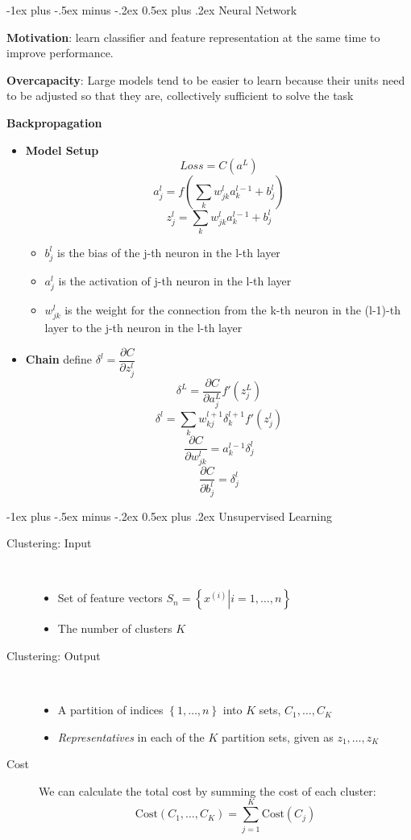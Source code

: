 \documentclass[a4paper, 10pt,landscape]{article}
\makeatletter
\renewcommand{\section}{\@startsection{section}{1}{0mm}%
                                {-1ex plus -.5ex minus -.2ex}%
                                {0.5ex plus .2ex}%
                                {\normalfont\large\bfseries}}
\makeatother
\begin{document}
\begin{multicols*}{3}
\section{Neural Network}
\begin{description}
	\item {\bf Motivation}: learn classifier and feature representation at the same time to improve performance. 
	\item {\bf Overcapacity}: Large models tend to be easier to learn because their units need to be adjusted so that they are, collectively sufficient to solve the task
	\item {\bf Backpropagation}~
		\begin{itemize}
			\item {\bf Model Setup}~
				$$Loss = C(a^L)$$
				$$a_j^l = f(\sum_k w_{jk}^l a_k^{l-1} + b_j^l)$$
				$$z_j^{l} = \sum_k w_{jk}^{l} a_k^{l-1} + b_j^l$$
					\begin{itemize}
						\item $b_j^l$ is the bias of the j-th neuron in the l-th layer
						\item $a_j^l$ is the activation of j-th neuron in the l-th layer
						\item $w_{jk}^l$ is the weight for the connection from the k-th neuron in the (l-1)-th layer to the j-th neuron in the l-th layer
					\end{itemize}
			\item {\bf Chain} define $\delta^l = \dfrac{\partial C}{\partial z_j^l}$
				$$\delta^{L} = \dfrac{\partial C}{\partial a_j^L}f'(z_j^L)$$
				$$\delta^l = \sum_k w_{kj}^{l+1}\delta_k^{l+1}f'(z_j^l)$$
				$$\dfrac{\partial C}{\partial w_{jk}^l} = a_k^{l-1} \delta_j^l$$
				$$\dfrac{\partial C}{\partial b_j^l} = \delta_j^l$$

		\end{itemize}
\end{description}

\section{Unsupervised Learning}
\begin{description}
	\item[Clustering: Input] ~
	\begin{itemize}[]
		\item Set of feature vectors $S_n=\left\{\left.x^{(i)}\right|i=1,\dots,n\right\}$
		\item The number of clusters $K$
	\end{itemize}
	\item[Clustering: Output] ~
	\begin{itemize}[]
		\item A partition of indices $\left\{1,\dots,n\right\}$ into $K$ sets, $C_1,\dots,C_K$
		\item {\it Representatives} in each of the $K$ partition sets, given as $z_1,\dots,z_K$
	\end{itemize}
	\item[Cost] We can calculate the total cost by summing the cost of each cluster:
	$$\text{Cost}\left(C_1,\dots,C_K\right)=\sum_{j=1}^{K}\text{Cost}\left(C_j\right)$$


\end{description}
\end{multicols*}
\end{document}
